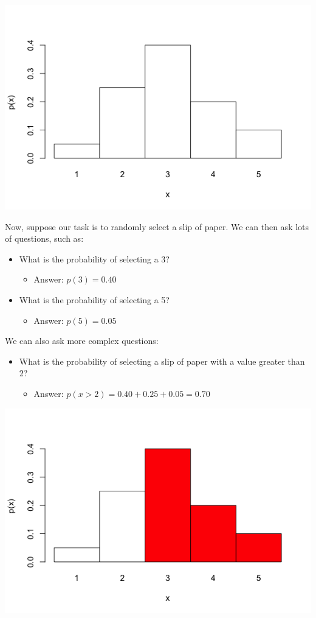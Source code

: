 \documentclass[11pt]{article}
\begin{document}
\includegraphics[width=.9\linewidth]{figures/week5/plot1.png}

Now, suppose our task is to randomly select a slip of paper.  We can then ask lots of questions, such as:

\begin{itemize}
\item What is the probability of selecting a 3?
\begin{itemize}
\item Answer: $p(3) = 0.40$
\end{itemize}
\item What is the probability of selecting a 5?
\begin{itemize}
\item Answer: $p(5) = 0.05$
\end{itemize}
\end{itemize}

We can also ask more complex questions:

\begin{itemize}
\item What is the probability of selecting a slip of paper with a value greater than 2?
\begin{itemize}
\item Answer: $p(x>2) = 0.40 + 0.25 + 0.05 = 0.70$
\end{itemize}
\end{itemize}

\includegraphics[width=.9\linewidth]{figures/week5/plot2.png}
\end{document}
